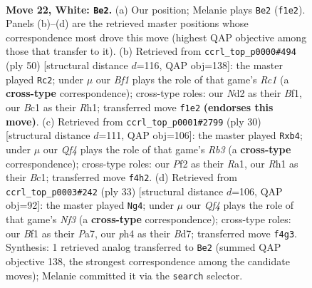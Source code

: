 \documentclass[11pt]{article}
\begin{document}
\begin{figure}[p]
\label{fig:thought-m40}
\end{figure}

\clearpage

\begin{figure}[p]\centering
\begin{subfigure}{0.46\textwidth}\centering
\resizebox{\linewidth}{!}{%
\newchessgame
\chessboard[
  setfen={r3k1nr/b1q5/4p3/pp2Pp2/b1pn1QPp/P7/RP1N1PP1/2B1KBNR w kq - 0 22},
  showmover=false,
  pgfstyle=straightmove, color=movearrow, markmove={f1-e2}
]}
\caption{}
\end{subfigure}\hfill
\begin{subfigure}{0.46\textwidth}\centering
\resizebox{\linewidth}{!}{%
\newchessgame
\chessboard[
  setfen={1rb2r1k/4q1p1/2p2n1p/p1Np4/2PQp1P1/7P/PP3P2/1KR2B1R w - - 3 26},
  showmover=false,
  pgfstyle=straightmove, color=movearrow, markmove={c1-c2}
]}
\caption{}
\end{subfigure}
\\[4pt]
\begin{subfigure}{0.46\textwidth}\centering
\resizebox{\linewidth}{!}{%
\newchessgame
\chessboard[
  setfen={r1q1kb1r/5ppp/p2pp3/5nPP/1p2b3/PRP5/1P2NP2/R1BQKB2 w Qkq - 1 16},
  showmover=false,
  pgfstyle=straightmove, color=movearrow, markmove={b3-b4}
]}
\caption{}
\end{subfigure}\hfill
\begin{subfigure}{0.46\textwidth}\centering
\resizebox{\linewidth}{!}{%
\newchessgame
\chessboard[
  setfen={r7/pp1b1rbk/2pq1npp/2pPp3/P1P1P2N/2NQ4/1P2BPP1/R3K2R b KQ - 2 17},
  showmover=false,
  pgfstyle=straightmove, color=movearrow, markmove={f6-g4}
]}
\caption{}
\end{subfigure}
\caption{\textbf{Move 22, White: \texttt{Be2}.} (a) Our position; Melanie plays \texttt{Be2} (\texttt{f1e2}). Panels (b)--(d) are the retrieved master positions whose correspondence most drove this move (highest QAP objective among those that transfer to it). (b) Retrieved from \texttt{ccrl\_top\_p0000\#494} (ply 50) [structural distance $d$=116, QAP obj=138]: the master played \texttt{Rc2}; under $\mu$ our \emph{Bf1} plays the role of that game's \emph{Rc1} (a \textbf{cross-type} correspondence); cross-type roles: our \emph{N}d2 as their \emph{B}f1, our \emph{B}c1 as their \emph{R}h1; transferred move \texttt{f1e2} \textbf{(endorses this move)}. (c) Retrieved from \texttt{ccrl\_top\_p0001\#2799} (ply 30) [structural distance $d$=111, QAP obj=106]: the master played \texttt{Rxb4}; under $\mu$ our \emph{Qf4} plays the role of that game's \emph{Rb3} (a \textbf{cross-type} correspondence); cross-type roles: our \emph{P}f2 as their \emph{R}a1, our \emph{R}h1 as their \emph{B}c1; transferred move \texttt{f4h2}. (d) Retrieved from \texttt{ccrl\_top\_p0003\#242} (ply 33) [structural distance $d$=106, QAP obj=92]: the master played \texttt{Ng4}; under $\mu$ our \emph{Qf4} plays the role of that game's \emph{Nf3} (a \textbf{cross-type} correspondence); cross-type roles: our \emph{B}f1 as their \emph{P}a7, our \emph{p}h4 as their \emph{B}d7; transferred move \texttt{f4g3}. Synthesis: 1 retrieved analog transferred to \texttt{Be2} (summed QAP objective 138, the strongest correspondence among the candidate moves); Melanie committed it via the \texttt{search} selector.}

\end{figure}
\end{document}
